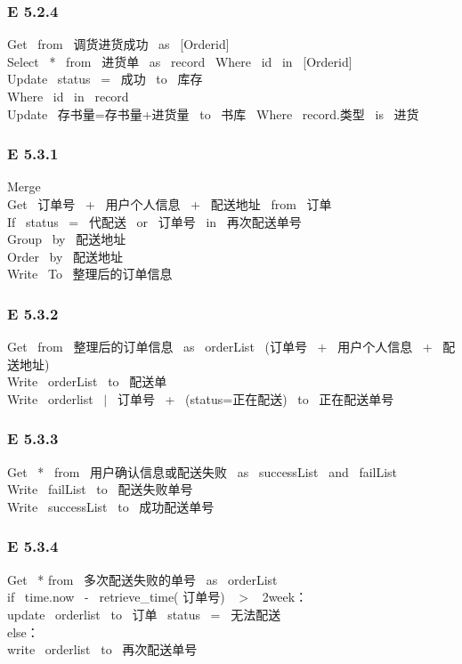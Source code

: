 \subsubsection*{E 5.2.4}
Get \ from \ 调货进货成功 \ as \ [Orderid] \\ 
Select \ * \ from \ 进货单 \ as \ record \ Where \ id \ in \ [Orderid] \\ 
Update \ status \ = \ 成功 \ to \ 库存\\ 
Where \ id \ in \ record\\ 
Update \ 存书量=存书量+进货量 \ to \ 书库 \ Where \ record.类型 \ is \ 进货\\ 
\vspace{-1mm}
\subsubsection*{E 5.3.1}
Merge\\ 
Get \ 订单号 \ + \ 用户个人信息 \ + \ 配送地址 \ from \ 订单 \\ 
If \ status \ = \ 代配送 \ or \ 订单号 \ in \ 再次配送单号 \\ 
Group \ by \ 配送地址\\ 
Order \ by \ 配送地址\\ 
Write \ To \ 整理后的订单信息\\ 
\vspace{-1mm}
\subsubsection*{E 5.3.2}
Get \ from \ 整理后的订单信息 \ as \ orderList \ (订单号 \ + \ 用户个人信息 \ + \ 配送地址) \\ 
Write \ orderList \ to \ 配送单\\ 
Write \ orderlist \ $|$ \ 订单号 \ + \ (status=正在配送) \ to \ 正在配送单号\\ 
\vspace{-1mm}
\subsubsection*{E 5.3.3}
Get \ * \ from \ 用户确认信息或配送失败 \ as \ successList \ and \ failList \\ 
Write \ failList \ to \ 配送失败单号\\ 
Write \ successList \ to \ 成功配送单号\\ 
\vspace{-1mm}
\subsubsection*{E 5.3.4}
Get \ * from \ 多次配送失败的单号 \ as \ orderList \\ 
if \ time.now \ - \ retrieve\_time( 订单号) \ $>$ \ 2week：\\ 
update \ orderlist \ to \ 订单 \ status \ = \ 无法配送 \\ 
else：\\ 
write \ orderlist \ to \ 再次配送单号\\ 
\vspace{-1mm}
